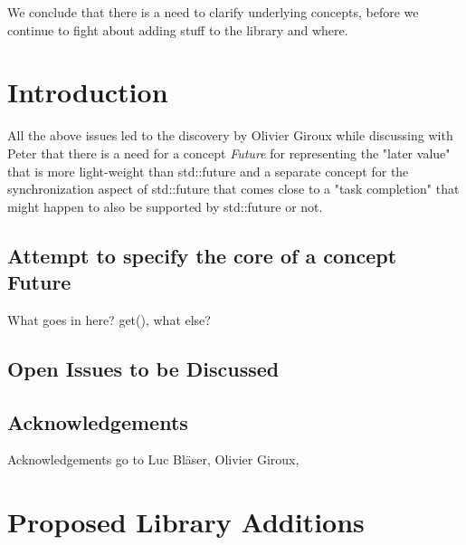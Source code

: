 \documentclass[ebook,11pt,article]{memoir}
\begin{document}
We conclude that there is a need to clarify underlying concepts, before we continue to fight about adding stuff to the library and where. 



\chapter{Introduction}
All the above issues led to the discovery by Olivier Giroux while discussing with Peter that there is a need for a concept \emph{Future} for representing the "later value" that is more light-weight than std::future and a separate concept for the synchronization aspect of std::future that comes close to a "task completion" that might happen to also be supported by std::future or not.

\section{Attempt to specify the core of a concept Future}

What goes in here? get(), what else?
\section{Open Issues to be Discussed}

\section{Acknowledgements}
Acknowledgements go to Luc Bläser, Olivier Giroux, 

\chapter{Proposed Library Additions}
%
%




\end{document}
